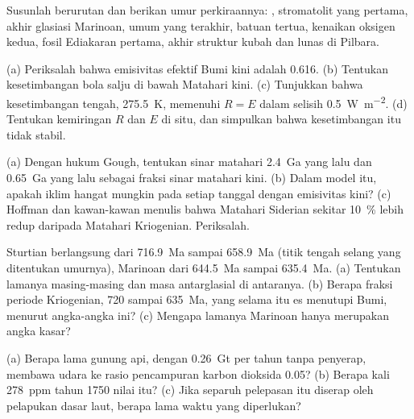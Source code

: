 \begin{exercise}[$\star$]\label{exo:b2:precambrian-earth:4}
Susunlah berurutan dan berikan umur perkiraannya: ,
stromatolit yang pertama, akhir glasiasi Marinoan,  umum yang terakhir,
batuan tertua, kenaikan oksigen kedua, fosil Ediakaran pertama, akhir struktur kubah dan lunas
di Pilbara.
\end{exercise}

\begin{exercise}[$\star\star$]\label{exo:b2:precambrian-earth:5}
(a) Periksalah bahwa emisivitas efektif Bumi kini adalah 0.616. (b) Tentukan kesetimbangan bola salju
di bawah Matahari kini. (c) Tunjukkan bahwa kesetimbangan tengah, \qty{275.5}{K}, memenuhi
$R = E$ dalam selisih \qty{0.5}{W.m^{-2}}. (d) Tentukan kemiringan $R$ dan $E$ di situ, dan simpulkan
bahwa kesetimbangan itu tidak stabil.
\end{exercise}

\begin{exercise}[$\star\star$]\label{exo:b2:precambrian-earth:6}
(a) Dengan hukum Gough, tentukan sinar matahari \qty{2.4}{Ga} yang lalu dan \qty{0.65}{Ga} yang lalu sebagai fraksi
sinar matahari kini. (b) Dalam model itu, apakah iklim hangat mungkin pada setiap tanggal dengan emisivitas kini?
(c) Hoffman dan kawan-kawan menulis bahwa Matahari Siderian sekitar \qty{10}{\percent} lebih redup daripada
Matahari Kriogenian. Periksalah.
\end{exercise}

\begin{exercise}[$\star\star$]\label{exo:b2:precambrian-earth:7}
Sturtian berlangsung dari \qty{716.9}{Ma} sampai \qty{658.9}{Ma} (titik tengah selang yang ditentukan umurnya),
Marinoan dari \qty{644.5}{Ma} sampai \qty{635.4}{Ma}. (a) Tentukan lamanya masing-masing dan
masa antarglasial di antaranya. (b) Berapa fraksi periode Kriogenian, 720 sampai \qty{635}{Ma},
yang selama itu es menutupi Bumi, menurut angka-angka ini? (c) Mengapa lamanya Marinoan hanya merupakan angka
kasar?
\end{exercise}

\begin{exercise}[$\star\star$]\label{exo:b2:precambrian-earth:8}
(a) Berapa lama gunung api, dengan \qty{0.26}{Gt} per tahun tanpa penyerap, membawa udara ke
rasio pencampuran karbon dioksida 0.05? (b) Berapa kali \qty{278}{ppm} tahun 1750 nilai itu? (c) Jika separuh pelepasan itu diserap oleh pelapukan dasar
laut, berapa lama waktu yang diperlukan?
\end{exercise}

